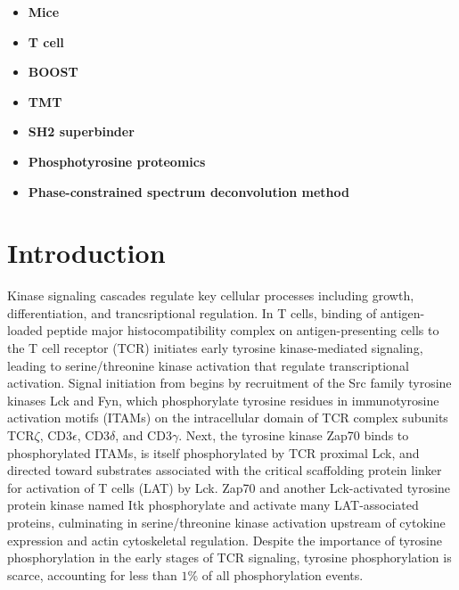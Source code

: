 \documentclass[journal=jprobs,manuscript=article]{achemso}
\begin{document}
\begin{itemize}
    \item {\textbf{Mice}}
    \item {\textbf{T cell}}
    \item {\textbf{BOOST} }
    \item {\textbf{TMT} }
    \item {\textbf{SH2 superbinder}}
    \item {\textbf{Phosphotyrosine proteomics} }
    \item {\textbf{Phase-constrained spectrum deconvolution method}}
\end{itemize}

\section{Introduction}


Kinase signaling cascades regulate key cellular processes including growth, differentiation, and trancsriptional regulation. In T cells, binding of antigen-loaded peptide major histocompatibility complex on antigen-presenting cells to the T cell  receptor (TCR) initiates early tyrosine kinase-mediated signaling, leading to serine/threonine kinase activation that regulate transcriptional activation\cite{gaud2018regulatory}. Signal initiation from begins by recruitment of the Src family tyrosine kinases Lck and Fyn, which phosphorylate tyrosine residues in immunotyrosine activation motifs (ITAMs) on the intracellular domain of TCR complex subunits TCR$\zeta$, CD3$\epsilon$, CD3$\delta$, and CD3$\gamma$\cite{palacios2004function,gaud2018regulatory}. Next, the tyrosine kinase Zap70 binds to phosphorylated ITAMs, is itself phosphorylated by TCR proximal Lck, and directed toward substrates associated with the critical scaffolding protein linker for activation of T cells (LAT) by Lck\cite{lo2018lck}. Zap70 and another Lck-activated tyrosine protein kinase named Itk phosphorylate and activate many LAT-associated proteins, culminating in serine/threonine kinase activation upstream of cytokine expression and actin cytoskeletal regulation\cite{}. Despite the importance of tyrosine phosphorylation in the early stages of TCR signaling, tyrosine phosphorylation is scarce, accounting for less than $1\%$ of all phosphorylation events\cite{hunter1980transforming,hunter2009tyrosine}.%
\end{document}
